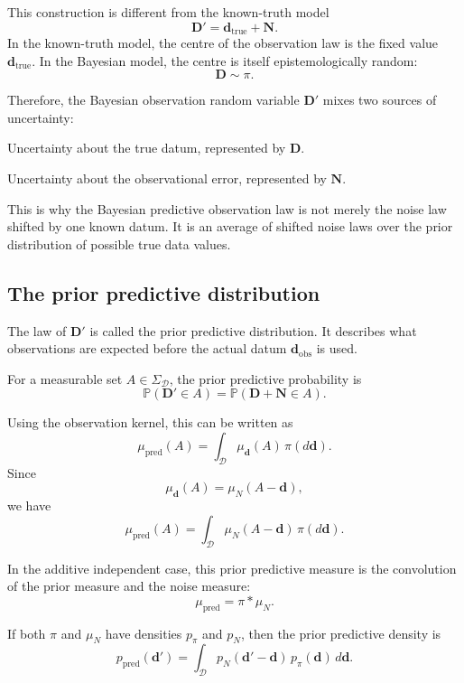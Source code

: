 \documentclass[11pt]{article}
\newcommand{\Dspace}{\mathcal D}
\newcommand{\SigmaD}{\Sigma_{\mathcal D}}
\newcommand{\muN}{\mu_N}
\newcommand{\prior}{\pi}
\newcommand{\Drand}{\mathbf D}
\newcommand{\Dobsrand}{\mathbf D'}
\newcommand{\Nrand}{\mathbf N}
\newcommand{\dtrue}{\mathbf d_{\mathrm{true}}}
\newcommand{\dobs}{\mathbf d_{\mathrm{obs}}}
\newcommand{\Prob}{\mathbb P}
\begin{document}
This construction is different from the known-truth model
\[
    \Dobsrand=\dtrue+\Nrand.
\]
In the known-truth model, the centre of the observation law is the fixed value \(\dtrue\). In the Bayesian model, the centre is itself epistemologically random:
\[
    \Drand\sim\prior.
\]

Therefore, the Bayesian observation random variable \(\Dobsrand\) mixes two sources of uncertainty:
\begin{description}[leftmargin=2.8cm,style=nextline]
    \item[Prior uncertainty.]
    Uncertainty about the true datum, represented by \(\Drand\).

    \item[Noise uncertainty.]
    Uncertainty about the observational error, represented by \(\Nrand\).
\end{description}

This is why the Bayesian predictive observation law is not merely the noise law shifted by one known datum. It is an average of shifted noise laws over the prior distribution of possible true data values.

\subsection{The prior predictive distribution}

The law of \(\Dobsrand\) is called the prior predictive distribution. It describes what observations are expected before the actual datum \(\dobs\) is used.

For a measurable set \(A\in\SigmaD\), the prior predictive probability is
\[
    \Prob(\Dobsrand\in A)
    =
    \Prob(\Drand+\Nrand\in A).
\]

Using the observation kernel, this can be written as
\[
    \mu_{\mathrm{pred}}(A)
    =
    \int_{\Dspace}
        \mu_{\mathbf d}(A)
    \,\prior(d\mathbf d).
\]
Since
\[
    \mu_{\mathbf d}(A)
    =
    \muN(A-\mathbf d),
\]
we have
\[
    \mu_{\mathrm{pred}}(A)
    =
    \int_{\Dspace}
        \muN(A-\mathbf d)
    \,\prior(d\mathbf d).
\]

In the additive independent case, this prior predictive measure is the convolution of the prior measure and the noise measure:
\[
    \mu_{\mathrm{pred}}
    =
    \prior * \muN.
\]

If both \(\prior\) and \(\muN\) have densities \(p_{\prior}\) and \(p_N\), then the prior predictive density is
\[
    p_{\mathrm{pred}}(\mathbf d')
    =
    \int_{\Dspace}
        p_N(\mathbf d'-\mathbf d)\,
        p_{\prior}(\mathbf d)
    \,d\mathbf d.
\]
\end{document}
